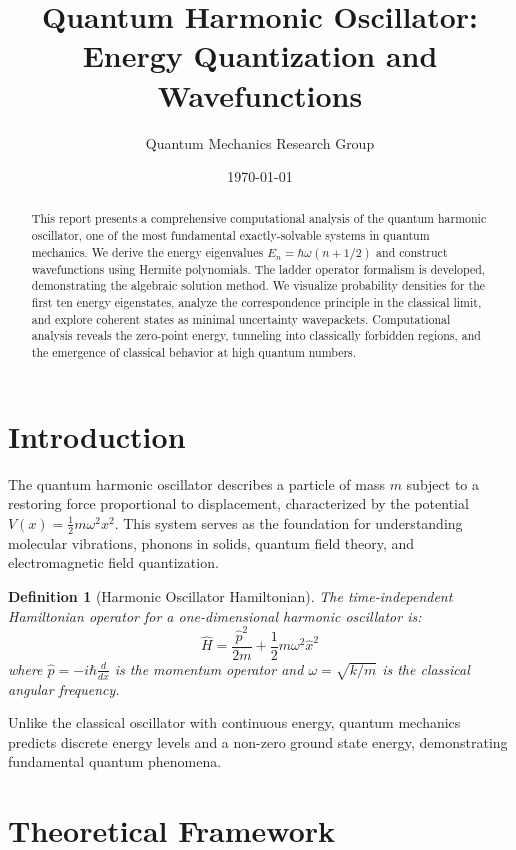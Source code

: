 \documentclass[a4paper, 11pt]{article}
\title{Quantum Harmonic Oscillator:\\Energy Quantization and Wavefunctions}
\author{Quantum Mechanics Research Group}
\date{\today}
\newtheorem{definition}{Definition}[section]
\begin{document}
\maketitle

\begin{abstract}
This report presents a comprehensive computational analysis of the quantum harmonic oscillator,
one of the most fundamental exactly-solvable systems in quantum mechanics. We derive the energy
eigenvalues $E_n = \hbar\omega(n + 1/2)$ and construct wavefunctions using Hermite polynomials.
The ladder operator formalism is developed, demonstrating the algebraic solution method. We
visualize probability densities for the first ten energy eigenstates, analyze the correspondence
principle in the classical limit, and explore coherent states as minimal uncertainty wavepackets.
Computational analysis reveals the zero-point energy, tunneling into classically forbidden
regions, and the emergence of classical behavior at high quantum numbers.
\end{abstract}

\section{Introduction}

The quantum harmonic oscillator describes a particle of mass $m$ subject to a restoring force
proportional to displacement, characterized by the potential $V(x) = \frac{1}{2}m\omega^2 x^2$.
This system serves as the foundation for understanding molecular vibrations, phonons in solids,
quantum field theory, and electromagnetic field quantization.

\begin{definition}[Harmonic Oscillator Hamiltonian]
The time-independent Hamiltonian operator for a one-dimensional harmonic oscillator is:
\begin{equation}
\hat{H} = \frac{\hat{p}^2}{2m} + \frac{1}{2}m\omega^2\hat{x}^2
\end{equation}
where $\hat{p} = -i\hbar\frac{d}{dx}$ is the momentum operator and $\omega = \sqrt{k/m}$ is
the classical angular frequency.
\end{definition}

Unlike the classical oscillator with continuous energy, quantum mechanics predicts discrete
energy levels and a non-zero ground state energy, demonstrating fundamental quantum phenomena.

\section{Theoretical Framework}
\end{document}

